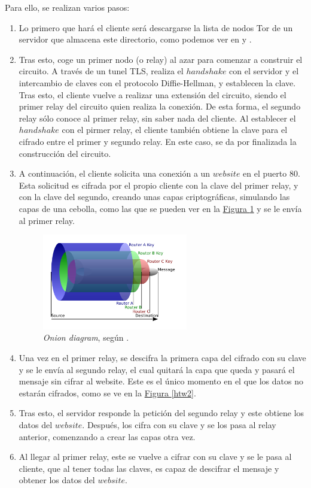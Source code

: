 \documentclass[10pt,a4paper,spanish]{article}
\begin{document}
Para ello, se realizan varios pasos:
\begin{enumerate}
    \item Lo primero que hará el cliente será descargarse la lista de nodos Tor de un servidor que almacena este directorio, como podemos ver en \cite{deftor} y \cite{mit}.
    \item Tras esto, coge un primer nodo (o relay) al azar para comenzar a construir el circuito. A través de un tunel TLS, realiza el $handshake$ con el servidor y el intercambio de claves con el protocolo Diffie-Hellman, y establecen la clave. Tras esto, el cliente vuelve a realizar una extensión del circuito, siendo el primer relay del circuito quien realiza la conexión. De esta forma, el segundo relay sólo conoce al primer relay, sin saber nada del cliente. Al establecer el $handshake$ con el pirmer relay, el cliente también obtiene la clave para el cifrado entre el primer y segundo relay. En este caso, se da por finalizada la construcción del circuito.
    \item A continuación, el cliente solicita una conexión a un $website$ en el puerto 80. Esta solicitud es cifrada por el propio cliente con la clave del primer relay, y con la clave del segundo, creando unas capas criptográficas, simulando las capas de una cebolla, como las que se pueden ver en la \hyperref[cebollas]{Figura \ref*{cebollas}} y se le envía al primer relay.
    
    \begin{figure}[!h]
        \centering
        \includegraphics[width=0.6\textwidth]{Onion}
        \caption{\textit{Onion diagram}, según \cite{cebollas}.}
        \label{cebollas}
    \end{figure}

    \item Una vez en el primer relay, se descifra la primera capa del cifrado con su clave y se le envía al segundo relay, el cual quitará la capa que queda y pasará el mensaje sin cifrar al website. Este es el único momento en el que los datos no estarán cifrados, como se ve en la \hyperref[htw2]{Figura \ref*{htw2}}.

    \item Tras esto, el servidor responde la petición del segundo relay y este obtiene los datos del $website$. Después, los cifra con su clave y se los pasa al relay anterior, comenzando a crear las capas otra vez.

    \item Al llegar al primer relay, este se vuelve a cifrar con su clave y se le pasa al cliente, que al tener todas las claves, es capaz de descifrar el mensaje y obtener los datos del $website$.

\end{enumerate}
\end{document}
